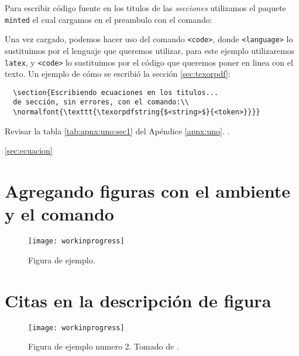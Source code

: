 Para escribir código fuente en los titulos de las \emph{secciones} utilizamos el paquete \texttt{minted} el cual cargamos en el preambulo con el comando:


Una vez cargado, podemos hacer uso del comando \texttt{\texttt{<code>}}, donde \texttt{<language>} lo sustituimos por el lenguaje que queremos utilizar, para este ejemplo utilizaremos \verb|latex|, y \verb|<code>| lo sustituimos por el código que queremos poner en linea con el texto. Un ejemplo de cómo se escribió la sección \ref{sec:texorpdf}:


\begin{verbatim}
  \section{Escribiendo ecuaciones en los titulos...
  de sección, sin errores, con el comando:\\
  \normalfont{\texttt{\texorpdfstring{$<string>$}{<token>}}}}
\end{verbatim}

\lipsum[4] Revisar la tabla \ref{tab:apnx:uno:sec1} del Apéndice \ref{apnx:uno}.
\lipsum[5-6]\citep{Dan,Baz}.

\ref{sec:ecuacion}


\section[Agregando figuras]{Agregando figuras con el ambiente\\  y el comando }
\lipsum[7]

\begin{figure}[!ht]
  \center
  \texttt{[image: workinprogress]}
  \caption{Figura de ejemplo.}
  \label{fig:ejemplo1}
\end{figure}

\lipsum[8]

\section{Citas en la descripción de figura}
\lipsum[9]
\begin{figure}[!ht]
  \center
  \texttt{[image: workinprogress]}
  \caption[Figura de ejemplo numero 2]{Figura de ejemplo numero 2. Tomado de \citep{Dan}.}
  \label{fig:ejemplo2}
\end{figure}

